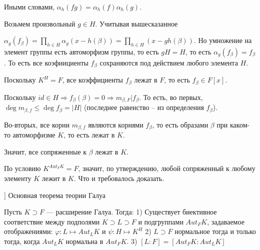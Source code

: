 \begin{solution}
Иными словами, \(\alpha_h(fg) = \alpha_h(f)\alpha_h(g)\).

Возьмем произвольный \(g \in H\). Учитывая вышесказанное

\(\alpha_g(f_\beta) = \prod\limits_{h \in H} \alpha_g(x - h(\beta)) = \prod\limits_{h \in H} (x - gh(\beta))\). Но умножение на элемент группы есть автоморфизм группы, то есть \(gH = H\), то есть \(\alpha_g(f_\beta) = f_\beta\). То есть все коэфиициенты \(f_\beta\) сохраняются под действием любого элемента \(H\).

Поскольку \(K^H = F\), все коэффициенты \(f_\beta\) лежат в \(F\), то есть \(f_\beta \in F[x]\).

Поскольку \(id \in H \Rightarrow f_\beta(\beta) = 0 \Rightarrow m_{\beta, F} | f_\beta\). То есть, во первых, \(\deg m_{\beta, f} \leqslant \deg f_\beta = |H|\) (последнее равенство -- из определения \(f_\beta\)).

Во-вторых, все корни \(m_{\beta, f}\) являются корнями \(f_\beta\), то есть образами \(\beta\) при каком-то автоморфизме \(K\), то есть лежат в \(K\).

Значит, все сопряженные к \(\beta\) лежат в \(K\).

По условию \(K^{Aut_FK} = F\), значит, по утверждению, любой сопряженный к любому элементу \(K\) лежит в \(K\). Что и требовалось доказать.
\end{solution}

\begin{problem}[8 [Каргальцев]]
Основная теорема теории Галуа

Пусть $K \supset F$ --- расширение Галуа. Тогда:
1) Существует биективное соответствие между подполями $K \supset L \supset F$ и подгруппами $Aut_FK$, задаваемое отображениями:
    $\varphi: L \mapsto Aut_LK$ и $\psi: H \mapsto K^H$
2) $L \supset F$ нормальное тогда и только тогда, когда $Aut_LK$ нормальна в $Aut_FK$.
3) $[L : F] = [Aut_FK : Aut_LK]$

\end{problem}

